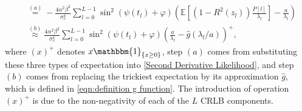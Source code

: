 \documentclass[12pt,draftclsnofoot,journal,onecolumn]{IEEEtran}
\theoremstyle{nonumberplain}
\begin{document}
\begin{IEEEproof}
\begin{equation}
\begin{aligned}
        & \overset{(a)}{=}  -\frac{4\alpha^2\beta^2}{\sigma_v^4}\sum_{l=0}^{L-1}{ \sin^2(\psi(t_l)+\varphi) \left(\mathbb{E}\left[(1-R^2(z_l))\frac{P[l]}{\lambda_l}\right] - \frac{a}{\lambda_l}\right) } \\
        & \overset{(b)}{\approx} \frac{4\alpha^2\beta^2}{\sigma_v^4}\sum_{l=0}^{L-1}{ \sin^2(\psi(t_l)+\varphi) \left(\frac{a}{\lambda_l}-\hat{g}(\lambda_l/a)\right)^{+} },
        \end{aligned}
        \label{eqn:CRLB}
    \end{equation}
    where $(x)^{+}$ denotes $x \mathbbm{1}_{\{x \ge 0\}}$, step $(a)$ comes from substituting these three types of expectation into \eqref{Second Derivative Likelihood}, and step $(b)$ comes from replacing the trickiest expectation by its approximation $\hat{g}$, which is defined in \eqref{eqn:definition g function}.  The introduction of operation $(x)^{+}$ is due to the non-negativity of each of the $L$ CRLB components. 
    

\end{IEEEproof}
\end{document}
